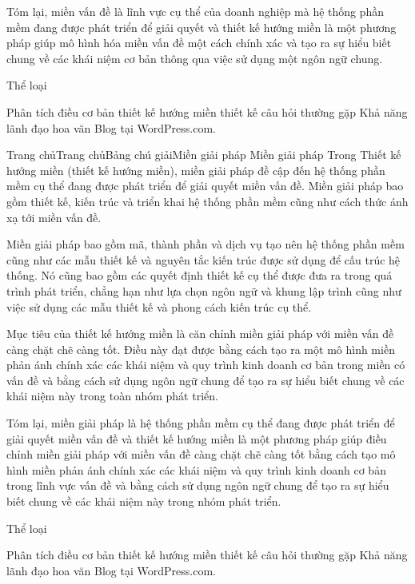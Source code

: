 Tóm lại, miền vấn đề là lĩnh vực cụ thể của doanh nghiệp mà hệ thống phần mềm đang được phát triển để giải quyết và thiết kế hướng miền là một phương pháp giúp mô hình hóa miền vấn đề một cách chính xác và tạo ra sự hiểu biết chung về các khái niệm cơ bản thông qua việc sử dụng một ngôn ngữ chung.

Thể loại

Phân tích
điều cơ bản
thiết kế hướng miền
thiết kế
câu hỏi thường gặp
Khả năng lãnh đạo
hoa văn
Blog tại WordPress.com.

Trang chủTrang chủBảng chú giảiMiền giải pháp
Miền giải pháp
Trong Thiết kế hướng miền (thiết kế hướng miền), miền giải pháp đề cập đến hệ thống phần mềm cụ thể đang được phát triển để giải quyết miền vấn đề. Miền giải pháp bao gồm thiết kế, kiến trúc và triển khai hệ thống phần mềm cũng như cách thức ánh xạ tới miền vấn đề.

Miền giải pháp bao gồm mã, thành phần và dịch vụ tạo nên hệ thống phần mềm cũng như các mẫu thiết kế và nguyên tắc kiến trúc được sử dụng để cấu trúc hệ thống. Nó cũng bao gồm các quyết định thiết kế cụ thể được đưa ra trong quá trình phát triển, chẳng hạn như lựa chọn ngôn ngữ và khung lập trình cũng như việc sử dụng các mẫu thiết kế và phong cách kiến trúc cụ thể.

Mục tiêu của thiết kế hướng miền là căn chỉnh miền giải pháp với miền vấn đề càng chặt chẽ càng tốt. Điều này đạt được bằng cách tạo ra một mô hình miền phản ánh chính xác các khái niệm và quy trình kinh doanh cơ bản trong miền có vấn đề và bằng cách sử dụng ngôn ngữ chung để tạo ra sự hiểu biết chung về các khái niệm này trong toàn nhóm phát triển.

Tóm lại, miền giải pháp là hệ thống phần mềm cụ thể đang được phát triển để giải quyết miền vấn đề và thiết kế hướng miền là một phương pháp giúp điều chỉnh miền giải pháp với miền vấn đề càng chặt chẽ càng tốt bằng cách tạo mô hình miền phản ánh chính xác các khái niệm và quy trình kinh doanh cơ bản trong lĩnh vực vấn đề và bằng cách sử dụng ngôn ngữ chung để tạo ra sự hiểu biết chung về các khái niệm này trong nhóm phát triển.

Thể loại

Phân tích
điều cơ bản
thiết kế hướng miền
thiết kế
câu hỏi thường gặp
Khả năng lãnh đạo
hoa văn
Blog tại WordPress.com.